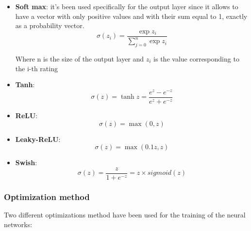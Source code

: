 \documentclass{article}
\begin{document}
\begin{itemize}
    \item \textbf{Soft max}: it's been used specifically for the output layer since it allows to have a vector with only positive values and with their sum equal to 1, exactly as a probability vector. 
    \begin{equation}\nonumber
        \sigma(z_i) = \frac{\exp{z_i}}{\sum_{j=0}^n \exp{z_i}}
    \end{equation}
    
    Where n is the size of the output layer and $z_i$ is the value corresponding to the i-th rating 
    
    \item \textbf{Tanh}: 
    \begin{equation}\nonumber
        \sigma(z) = \tanh{z} = \frac{e^{z} - e^{-z}}{e^{z} + e^{-z}}
    \end{equation}
    
    \item \textbf{ReLU}:
    \begin{equation}\nonumber
        \sigma(z) = \max(0 , z)
    \end{equation}
    
    \item \textbf{Leaky-ReLU}:
    \begin{equation}\nonumber
        \sigma(z) = \max(0.1z , z)
    \end{equation}
    
    \item \textbf{Swish}:
    \begin{equation}\nonumber
        \sigma(z) = \frac{z}{1 + e^{-z}} = z \times sigmoid(z)
    \end{equation}
\end{itemize}

\subsubsection{Optimization method}
Two different optimizations method have been used for the training of the neural networks:
\end{document}
